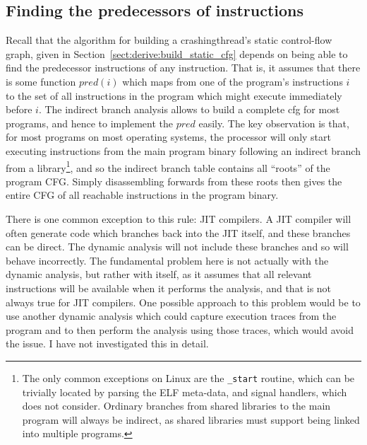 
\subsection{Finding the predecessors of instructions}
\label{sect:program_model:instr_predecessors}

Recall that the algorithm for building a \gls{crashingthread}'s static
control-flow graph, given in
Section~\ref{sect:derive:build_static_cfg} depends on being able to
find the predecessor instructions of any instruction.  That is, it
assumes that there is some function $\mathit{pred}(i)$ which maps from
one of the program's instructions $i$ to the set of all instructions
in the program which might execute immediately before $i$.  The
indirect branch analysis allows {\technique} to build a complete
\gls{cfg} for most programs, and hence to implement the
$\mathit{pred}$ easily.  The key observation is that, for most
programs on most operating systems, the processor will only start
executing instructions from the main program binary following an
indirect branch from a library\footnote{The only common exceptions on
  Linux are the \texttt{\_start} routine, which can be trivially
  located by parsing the ELF meta-data, and signal handlers, which
  {\technique} does not consider.  Ordinary branches from shared
  libraries to the main program will always be indirect, as shared
  libraries must support being linked into multiple programs.}, and so
the indirect branch table contains all ``roots'' of the program CFG.
Simply disassembling forwards from these roots then gives the entire
CFG of all reachable instructions in the program binary.

There is one common exception to this rule: JIT compilers\needCite{}.
A JIT compiler will often generate code which branches back into the
JIT itself, and these branches can be direct.  The
dynamic analysis will not include these branches and so
{\implementation} will behave incorrectly.  The fundamental problem
here is not actually with the dynamic analysis, but rather with
{\technique} itself, as it assumes that all relevant instructions will
be available when it performs the analysis, and that is not always
true for JIT compilers.  One possible approach to this problem would
be to use another dynamic analysis which could capture execution
traces from the program and to then perform the analysis using those
traces, which would avoid the issue.  I have not investigated this in
detail.

